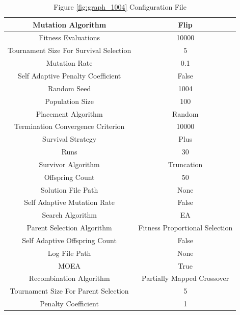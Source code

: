 \documentclass{standalone}
\begin{document}
\begin{table}[!htb]
	\centering
	\caption{Figure \ref{fig:graph_1004} Configuration File}
	\label{tab:graph_1004}
	\begin{tabular}{| c | c |}
		\hline
		Mutation Algorithm		& Flip		 \\
		\hline
		Fitness Evaluations		& 10000		 \\
		\hline
		Tournament Size For Survival Selection		& 5		 \\
		\hline
		Mutation Rate		& 0.1		 \\
		\hline
		Self Adaptive Penalty Coefficient		& False		 \\
		\hline
		Random Seed		& 1004		 \\
		\hline
		Population Size		& 100		 \\
		\hline
		Placement Algorithm		& Random		 \\
		\hline
		Termination Convergence Criterion		& 10000		 \\
		\hline
		Survival Strategy		& Plus		 \\
		\hline
		Runs		& 30		 \\
		\hline
		Survivor Algorithm		& Truncation		 \\
		\hline
		Offspring Count		& 50		 \\
		\hline
		Solution File Path		& None		 \\
		\hline
		Self Adaptive Mutation Rate		& False		 \\
		\hline
		Search Algorithm		& EA		 \\
		\hline
		Parent Selection Algorithm		& Fitness Proportional Selection		 \\
		\hline
		Self Adaptive Offspring Count		& False		 \\
		\hline
		Log File Path		& None		 \\
		\hline
		MOEA		& True		 \\
		\hline
		Recombination Algorithm		& Partially Mapped Crossover		 \\
		\hline
		Tournament Size For Parent Selection		& 5		 \\
		\hline
		Penalty Coefficient		& 1		 \\
		\hline
	\end{tabular}
\end{table}
\end{document}
